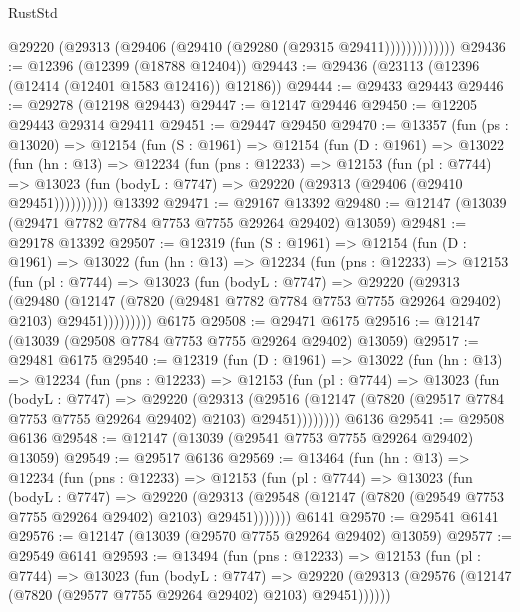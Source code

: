 \begin{lexlean}{RustStd}
\begin{coremodule}
                  @29220 (@29313 (@29406 (@29410 (@29280 (@29315 @29411)))))))))))))
@29436 := @12396 (@12399 (@18788 @12404))
@29443 := @29436 (@23113 (@12396 (@12414 (@12401 @1583 @12416)) @12186))
@29444 := @29433 @29443
@29446 := @29278 (@12198 @29443)
@29447 := @12147 @29446
@29450 := @12205 @29443 @29314 @29411
@29451 := @29447 @29450
@29470 := @13357
    (fun (ps : @13020) =>
    @12154
      (fun (S : @1961) =>
      @12154
        (fun (D : @1961) =>
        @13022
          (fun (hn : @13) =>
          @12234
            (fun (pns : @12233) =>
            @12153
              (fun (pl : @7744) =>
              @13023 (fun (bodyL : @7747) => @29220 (@29313 (@29406 (@29410 @29451))))))))))
    @13392
@29471 := @29167 @13392
@29480 := @12147 (@13039 (@29471 @7782 @7784 @7753 @7755 @29264 @29402) @13059)
@29481 := @29178 @13392
@29507 := @12319
    (fun (S : @1961) =>
    @12154
      (fun (D : @1961) =>
      @13022
        (fun (hn : @13) =>
        @12234
          (fun (pns : @12233) =>
          @12153
            (fun (pl : @7744) =>
            @13023
              (fun (bodyL : @7747) =>
              @29220
                (@29313
                  (@29480
                    (@12147
                      (@7820 (@29481 @7782 @7784 @7753 @7755 @29264 @29402) @2103)
                      @29451)))))))))
    @6175
@29508 := @29471 @6175
@29516 := @12147 (@13039 (@29508 @7784 @7753 @7755 @29264 @29402) @13059)
@29517 := @29481 @6175
@29540 := @12319
    (fun (D : @1961) =>
    @13022
      (fun (hn : @13) =>
      @12234
        (fun (pns : @12233) =>
        @12153
          (fun (pl : @7744) =>
          @13023
            (fun (bodyL : @7747) =>
            @29220
              (@29313
                (@29516
                  (@12147 (@7820 (@29517 @7784 @7753 @7755 @29264 @29402) @2103) @29451))))))))
    @6136
@29541 := @29508 @6136
@29548 := @12147 (@13039 (@29541 @7753 @7755 @29264 @29402) @13059)
@29549 := @29517 @6136
@29569 := @13464
    (fun (hn : @13) =>
    @12234
      (fun (pns : @12233) =>
      @12153
        (fun (pl : @7744) =>
        @13023
          (fun (bodyL : @7747) =>
          @29220
            (@29313 (@29548 (@12147 (@7820 (@29549 @7753 @7755 @29264 @29402) @2103) @29451)))))))
    @6141
@29570 := @29541 @6141
@29576 := @12147 (@13039 (@29570 @7755 @29264 @29402) @13059)
@29577 := @29549 @6141
@29593 := @13494
    (fun (pns : @12233) =>
    @12153
      (fun (pl : @7744) =>
      @13023
        (fun (bodyL : @7747) =>
        @29220 (@29313 (@29576 (@12147 (@7820 (@29577 @7755 @29264 @29402) @2103) @29451))))))

\end{coremodule}
\end{lexlean}
